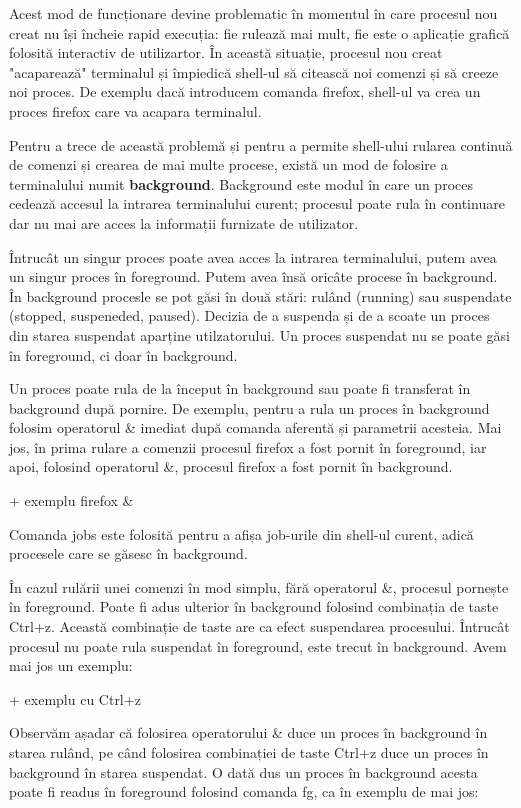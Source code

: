 Acest mod de funcționare devine problematic în momentul în care procesul nou
creat nu își încheie rapid execuția: fie rulează mai mult, fie este o aplicație
grafică folosită interactiv de utilizartor. În această situație, procesul nou
creat "acaparează" terminalul și împiedică shell-ul să citească noi comenzi și
să creeze noi proces. De exemplu dacă introducem comanda firefox, shell-ul va
crea un proces firefox care va acapara terminalul.

Pentru a trece de această problemă și pentru a permite shell-ului rularea
continuă de comenzi și crearea de mai multe procese, există un mod de folosire a
terminalului numit \textbf{background}. Background este modul în care un proces
cedează accesul la intrarea terminalului curent; procesul poate rula în
continuare dar nu mai are acces la informații furnizate de utilizator.

Întrucât un singur proces poate avea acces la intrarea terminalului, putem avea
un singur proces în foreground. Putem avea însă oricâte procese în background.
În background procesle se pot găsi în două stări: rulând (running) sau
suspendate (stopped, suspeneded, paused). Decizia de a suspenda și de a scoate
un proces din starea suspendat aparține utilzatorului. Un proces suspendat nu se
poate găsi în foreground, ci doar în background.

Un proces poate rula de la început în background sau poate fi transferat în
background după pornire. De exemplu, pentru a rula un proces în background
folosim operatorul \& imediat după comanda aferentă și parametrii acesteia. Mai
jos, în prima rulare a comenzii procesul firefox a fost pornit în foreground,
iar apoi, folosind operatorul \&, procesul firefox a fost pornit în background.

+ exemplu firefox \&

Comanda jobs este folosită pentru a afișa job-urile din shell-ul curent, adică
procesele care se găsesc în background.

În cazul rulării unei comenzi în mod simplu, fără operatorul \&, procesul
pornește în foreground. Poate fi adus ulterior în background folosind combinația
de taste Ctrl+z. Această combinație de taste are ca efect suspendarea
procesului. Întrucât procesul nu poate rula suspendat în foreground, este trecut
în background. Avem mai jos un exemplu:

+ exemplu cu Ctrl+z

Observăm așadar că folosirea operatorului \& duce un proces în background în
starea rulând, pe când folosirea combinației de taste Ctrl+z duce un proces în
background în starea suspendat. O dată dus un proces în background acesta poate
fi readus în foreground folosind comanda fg, ca în exemplu de mai jos:

